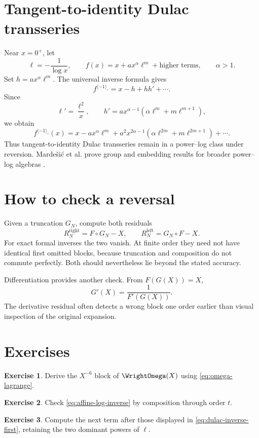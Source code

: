 \documentclass[11pt,openany]{book}
\theoremstyle{definition}
\newtheorem{exercise}{Exercise}[chapter]
\theoremstyle{plain}
\theoremstyle{remark}
\newcommand{\invcomp}{^{\langle -1\rangle_{\circ}}}
\begin{document}
\section{Tangent-to-identity Dulac transseries}
Near \(x=0^+\), let
\[
 \ell=-\frac1{\log x},
 \qquad
 f(x)=x+a x^\alpha\ell^m+\text{higher terms},
 \qquad \alpha>1.
\]
Set \(h=a x^\alpha\ell^m\). The universal inverse formula gives
\[
 f\invcomp=x-h+hh'+\cdots.
\]
Since
\[
 \ell'=\frac{\ell^2}{x},
 \qquad
 h'=a x^{\alpha-1}
 \left(\alpha\ell^m+m\ell^{m+1}\right),
\]
we obtain
\begin{equation}\label{eq:dulac-inverse-first}
 f\invcomp(x)
 =x-a x^\alpha\ell^m
 +a^2x^{2\alpha-1}
 \left(\alpha\ell^{2m}+m\ell^{2m+1}\right)
 +\cdots.
\end{equation}
Thus tangent-to-identity Dulac transseries remain in a power--log class under reversion. Marde\v{s}i\'c et al. prove group and embedding results for broader power--log algebras \cite{mardesic-normalforms}.

\section{How to check a reversal}
Given a truncation \(G_N\), compute both residuals
\begin{equation}\label{eq:two-residuals}
 R_N^{\mathrm{right}}=F\circ G_N-X,
 \qquad
 R_N^{\mathrm{left}}=G_N\circ F-X.
\end{equation}
For exact formal inverses the two vanish. At finite order they need not have identical first omitted blocks, because truncation and composition do not commute perfectly. Both should nevertheless lie beyond the stated accuracy.

Differentiation provides another check. From \(F(G(X))=X\),
\begin{equation}\label{eq:inverse-derivative-check}
 G'(X)=\frac1{F'(G(X))}.
\end{equation}
The derivative residual often detects a wrong block one order earlier than visual inspection of the original expansion.

\section{Exercises}
\begin{exercise}
Derive the \(X^{-6}\) block of \(\WrightOmega(X)\) using \cref{eq:omega-lagrange}.
\end{exercise}
\begin{exercise}
Check \cref{eq:affine-log-inverse} by composition through order \(t\).
\end{exercise}
\begin{exercise}
Compute the next term after those displayed in \cref{eq:dulac-inverse-first}, retaining the two dominant powers of \(\ell\).
\end{exercise}
\end{document}
